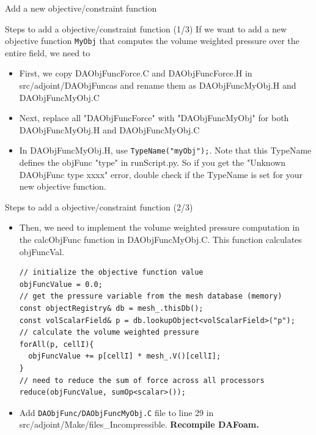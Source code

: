 \documentclass{bredelebeamer}
\begin{document}
\begin{frame}{}
  \center \Large Add a new objective/constraint function
\end{frame}

\begin{frame}[fragile]{Steps to add a objective/constraint function (1/3)}
If we want to add a new objective function \texttt{MyObj} that computes the volume weighted pressure over the entire field, we need to
\begin{itemize}
  \setlength\itemsep{0.5em}
 \item First, we copy DAObjFuncForce.C and DAObjFuncForce.H in src/adjoint/DAObjFuncas and rename them as DAObjFuncMyObj.H and DAObjFuncMyObj.C
 \item Next, replace all "DAObjFuncForce" with "DAObjFuncMyObj" for both DAObjFuncMyObj.H and DAObjFuncMyObj.C
 \item In DAObjFuncMyObj.H, use \texttt{TypeName("myObj");}. Note that this TypeName defines the objFunc "type" in runScript.py. So if you get the "Unknown DAObjFunc type xxxx" error, double check if the TypeName is set for your new objective function.
\end{itemize}
\end{frame}

\begin{frame}[fragile]{Steps to add a objective/constraint function (2/3)}
\begin{itemize}
  \setlength\itemsep{0.5em}
 \item Then, we need to implement the volume weighted pressure computation in the calcObjFunc function in DAObjFuncMyObj.C. This function calculates objFuncVal.
 \footnotesize
 \lstset{ language=c++ }
 \begin{lstlisting}
// initialize the objective function value
objFuncValue = 0.0;
// get the pressure variable from the mesh database (memory)
const objectRegistry& db = mesh_.thisDb();
const volScalarField& p = db.lookupObject<volScalarField>("p");
// calculate the volume weighted pressure
forAll(p, cellI){
  objFuncValue += p[cellI] * mesh_.V()[cellI];
}
// need to reduce the sum of force across all processors
reduce(objFuncValue, sumOp<scalar>());
 \end{lstlisting}
 \normalsize
 \item Add \texttt{DAObjFunc/DAObjFuncMyObj.C} file to line 29 in src/adjoint/Make/files\_Incompressible. \textbf{Recompile DAFoam.}
\end{itemize}
\end{frame}
\end{document}
